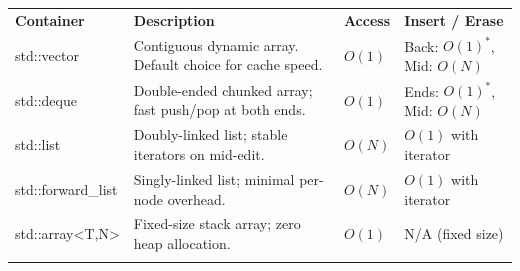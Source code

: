 \documentclass[11pt,a4paper]{article}
\begin{document}
\begingroup\small{}
\begin{tabularx}{\textwidth}{>{\raggedright\arraybackslash\ttfamily}p{3.3cm} >{\raggedright\arraybackslash}X >{\centering\arraybackslash}p{1.6cm} >{\raggedright\arraybackslash}p{3.5cm}}
\arrayrulecolor{primaryblue}\toprule[1.1pt]
\rowcolor{primaryblue!10}
\textcolor{primaryblue}{\normalfont\bfseries Container} & \textcolor{primaryblue}{\textbf{Description}} & \textcolor{primaryblue}{\textbf{Access}} & \textcolor{primaryblue}{\textbf{Insert / Erase}} \\
\arrayrulecolor{codeframe}\midrule[0.6pt]
std::vector & Contiguous dynamic array. Default choice for cache speed. & $O(1)$ & Back: $O(1)^*$, Mid: $O(N)$ \\
std::deque & Double-ended chunked array; fast push/pop at both ends. & $O(1)$ & Ends: $O(1)^*$, Mid: $O(N)$ \\
std::list & Doubly-linked list; stable iterators on mid-edit. & $O(N)$ & $O(1)$ with iterator \\
std::forward\_list & Singly-linked list; minimal per-node overhead. & $O(N)$ & $O(1)$ with iterator \\
std::array<T,N> & Fixed-size stack array; zero heap allocation. & $O(1)$ & N/A (fixed size) \\
\arrayrulecolor{primaryblue}\bottomrule[1.1pt]
\end{tabularx}\endgroup

\end{document}
